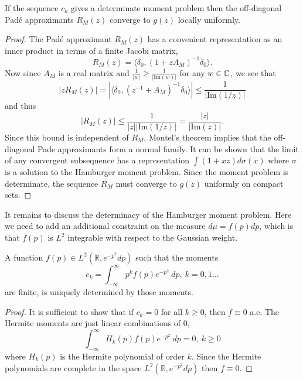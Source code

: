 \begin{proposition}
  If the sequence $c_k$ gives a determinate moment problem then the off-diagonal Pad\'e approximants $R_M(z)$ converge to $g(z)$ locally uniformly.
\end{proposition}

\begin{proof}
  The Pad\'e approximant $R_M(z)$ has a convenient representation as an inner product in terms of a finite Jacobi matrix,
  \[
    R_M(z) = \langle \delta_0, {(1 + zA_M)}^{-1} \delta_0 \rangle.
  \]
  Now since $A_M$ is a real matrix and $\frac1{|w|} \geq \frac1{|\text{Im}(w)|}$ for any $w \in \mathbb{C}$, we see that
  \[
    |zR_M(z)| = |\langle \delta_0, {(z^{-1} + A_M)}^{-1} \delta_0 \rangle| \leq \frac1{|\text{Im}(1/z)|}
  \]
  and thus
  \[
    |R_M(z)| \leq \frac1{|z||\text{Im}(1/z)|} = \frac{|z|}{|\text{Im}(z)|}.
  \]
  Since this bound is independent of $R_M$, Montel's theorem implies that the off-diagonal Pade approximants form a normal family. It can be shown that the limit of any convergent subsequence has a representation $\int (1+ xz)d\sigma(x)$ where $\sigma$ is a solution to the Hamburger moment problem. Since the moment problem is determinate, the sequence $R_M$ must converge to $g(z)$ uniformly on compact sets.
\end{proof}

It remains to discuss the determinacy of the Hamburger moment problem. Here we need to add an additional constraint on the measure $d\mu = f(p)dp$, which is that $f(p)$ is $L^2$ integrable with respect to the Gaussian weight.

\begin{proposition}
  A function $f(p) \in L^2(\mathbb{R}, e^{-p^2}dp)$ such that the moments 
  \begin{equation}
    \label{eq:3}
    c_k = \int_{-\infty}^\infty p^k f(p) e^{-p^2} ~dp, ~ k = 0, 1 \ldots
  \end{equation}
  are finite, is uniquely determined by those moments.
\end{proposition}
    
\begin{proof}
  It is sufficient to show that if $c_k = 0$ for all $k \geq 0$, then $f \equiv 0$ a.e. The Hermite moments are just linear combinations of $0$,
  \[
      \int_{-\infty}^\infty H_k(p) f(p) e^{-p^2} ~dp = 0, ~ k \geq 0
  \]
  where $H_k(p)$ is the Hermite polynomial of order $k$. Since the Hermite polynomials are complete in the space $L^2(\mathbb{R}, e^{-p^2}dp)$ then $f \equiv 0$.
\end{proof}






